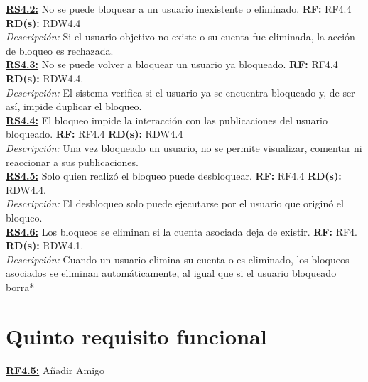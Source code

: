 \textbf{\textcolor{verde}{\underline{RS4.2:}}} No se puede bloquear a un usuario inexistente o eliminado. \textbf{RF:} RF4.4 \textbf{RD(s):} RDW4.4 \\ 
\hspace*{1cm} \textit{Descripción:} Si el usuario objetivo no existe o su cuenta fue eliminada, la acción de bloqueo es rechazada. \\[4pt]

\textbf{\textcolor{verde}{\underline{RS4.3:}}} No se puede volver a bloquear un usuario ya bloqueado. \textbf{RF:} RF4.4 \textbf{RD(s):} RDW4.4. \\ 
\hspace*{1cm} \textit{Descripción:} El sistema verifica si el usuario ya se encuentra bloqueado y, de ser así, impide duplicar el bloqueo. \\[4pt]

\textbf{\textcolor{verde}{\underline{RS4.4:}}} El bloqueo impide la interacción con las publicaciones del usuario bloqueado. \textbf{RF:} RF4.4 \textbf{RD(s):} RDW4.4 \\ 
\hspace*{1cm} \textit{Descripción:} Una vez bloqueado un usuario, no se permite visualizar, comentar ni reaccionar a sus publicaciones. \\[4pt]

\textbf{\textcolor{verde}{\underline{RS4.5:}}} Solo quien realizó el bloqueo puede desbloquear. \textbf{RF:} RF4.4 \textbf{RD(s):} RDW4.4. \\ 
\hspace*{1cm} \textit{Descripción:} El desbloqueo solo puede ejecutarse por el usuario que originó el bloqueo. \\[4pt]

\textbf{\textcolor{verde}{\underline{RS4.6:}}} Los bloqueos se eliminan si la cuenta asociada deja de existir. \textbf{RF:} RF4. \textbf{RD(s):} RDW4.1. \\ 
\hspace*{1cm} \textit{Descripción:} Cuando un usuario elimina su cuenta o es eliminado, los bloqueos asociados se eliminan automáticamente, al igual que si el usuario bloqueado borra*


\section{Quinto requisito funcional}
\textbf{\textcolor{rojo}{\underline{RF4.5:}}} Añadir Amigo \\[6pt]

